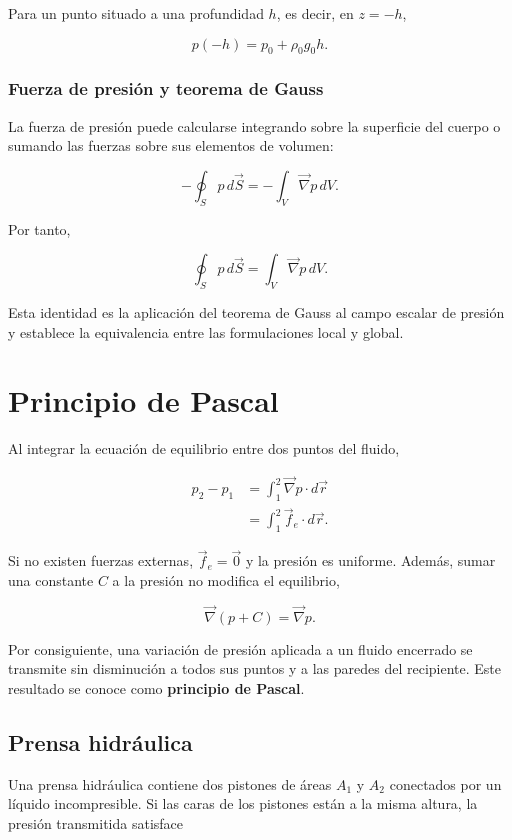 Para un punto situado a una profundidad $h$, es decir, en $z=-h$,

$$
\boxed{
p(-h)=p_0+\rho_0g_0h
}.
$$

\subsubsection{Fuerza de presión y teorema de Gauss}

La fuerza de presión puede calcularse integrando sobre la superficie del
cuerpo o sumando las fuerzas sobre sus elementos de volumen:

$$
-\oint_Sp\,d\vec{S}
=-\int_V\vec{\nabla}p\,dV.
$$

Por tanto,

$$
\boxed{
\oint_Sp\,d\vec{S}
=\int_V\vec{\nabla}p\,dV
}.
$$

Esta identidad es la aplicación del teorema de Gauss al campo escalar de
presión y establece la equivalencia entre las formulaciones local y global.

\section{Principio de Pascal}

Al integrar la ecuación de equilibrio entre dos puntos del fluido,

$$
\begin{aligned}
p_2-p_1
&=\int_1^2\vec{\nabla}p\cdot d\vec{r}\\
&=\int_1^2\vec{f}_e\cdot d\vec{r}.
\end{aligned}
$$

Si no existen fuerzas externas, $\vec{f}_e=\vec{0}$ y la presión es uniforme.
Además, sumar una constante $C$ a la presión no modifica el equilibrio,

$$
\vec{\nabla}(p+C)=\vec{\nabla}p.
$$

Por consiguiente, una variación de presión aplicada a un fluido encerrado se
transmite sin disminución a todos sus puntos y a las paredes del recipiente.
Este resultado se conoce como \textbf{principio de Pascal}.

\subsection{Prensa hidráulica}

Una prensa hidráulica contiene dos pistones de áreas $A_1$ y $A_2$ conectados
por un líquido incompresible. Si las caras de los pistones están a la misma
altura, la presión transmitida satisface

